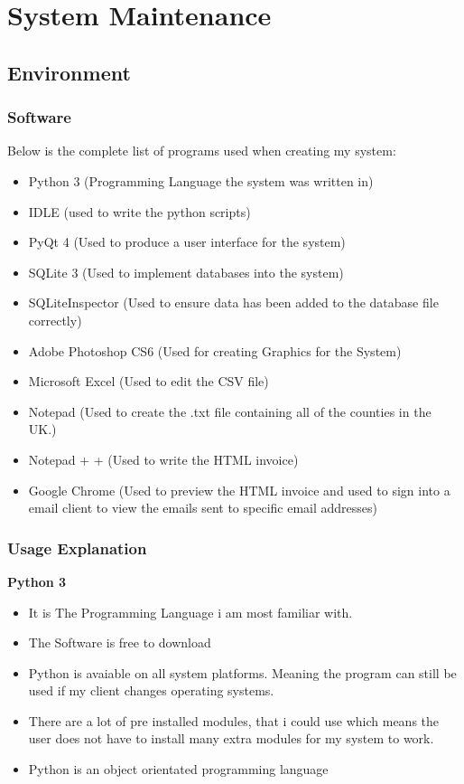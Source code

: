 \chapter{System Maintenance}

\section{Environment}

\subsection{Software}

Below is the complete list of programs used when creating my system:

\begin{itemize}
	\item Python 3 (Programming Language the system was written in)
	\item IDLE (used to write the python scripts)
	\item PyQt 4 (Used to produce a user interface for the system)
    	\item SQLite 3 (Used to implement databases into the system)
	\item SQLiteInspector (Used to ensure data has been added to the database file correctly)
	\item Adobe Photoshop CS6 (Used for creating Graphics for the System)
	\item Microsoft Excel (Used to edit the CSV file)
	\item Notepad (Used to create the .txt file containing all of the counties in the UK.)
	\item Notepad + + (Used to write the HTML invoice)
	\item Google Chrome (Used to preview the HTML invoice and used to sign into a email client to view the emails sent to specific email addresses)
\end{itemize}

\pagebreak

\subsection{Usage Explanation}

\textbf{Python 3}
\begin{itemize}
	\item It is The Programming Language i am most familiar with.
	\item The Software is free to download
	\item Python is avaiable on all system platforms. Meaning the program can still be used if my client changes operating systems.
	\item There are a lot of pre installed modules, that i could use which means the user does not have to install many extra modules for my system to work.
	\item Python is an object orientated programming language
\end{itemize}
\vspace{5mm}

